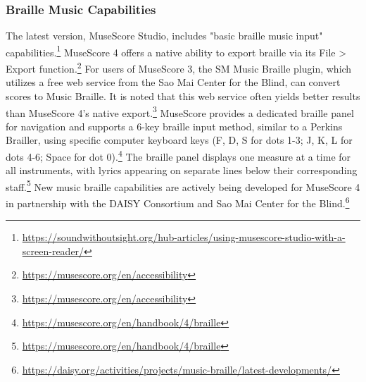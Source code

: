 \subsubsection{Braille Music Capabilities}
The latest version, MuseScore Studio, includes "basic braille music input" capabilities.\footnote{\url{https://soundwithoutsight.org/hub-articles/using-musescore-studio-with-a-screen-reader/}} MuseScore 4 offers a native ability to export braille via its File > Export function.\footnote{\url{https://musescore.org/en/accessibility}} For users of MuseScore 3, the SM Music Braille plugin, which utilizes a free web service from the Sao Mai Center for the Blind, can convert scores to Music Braille. It is noted that this web service often yields better results than MuseScore 4's native export.\footnote{\url{https://musescore.org/en/accessibility}} MuseScore provides a dedicated braille panel for navigation and supports a 6-key braille input method, similar to a Perkins Brailler, using specific computer keyboard keys (F, D, S for dots 1-3; J, K, L for dots 4-6; Space for dot 0).\footnote{\url{https://musescore.org/en/handbook/4/braille}} The braille panel displays one measure at a time for all instruments, with lyrics appearing on separate lines below their corresponding staff.\footnote{\url{https://musescore.org/en/handbook/4/braille}} New music braille capabilities are actively being developed for MuseScore 4 in partnership with the DAISY Consortium and Sao Mai Center for the Blind.\footnote{\url{https://daisy.org/activities/projects/music-braille/latest-developments/}}

